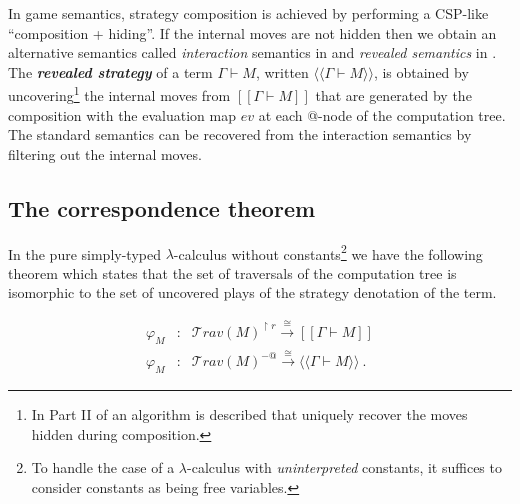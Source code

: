 \documentclass{llncs}
\newcommand\defname[1]{{\bf\em #1}\index{#1}}
\newcommand\travset{\mathcal{T}rav}
\newcommand{\sem}[1]{{[\![ #1 ]\!]}}
\newcommand{\intersem}[1]{{\langle\!\langle #1 \rangle\!\rangle}}
\begin{document}
In game semantics, strategy composition is achieved by performing a
CSP-like ``composition + hiding''. If the internal moves are not hidden
then we obtain an alternative semantics called \emph{interaction}
semantics in \cite{DBLP:conf/sas/DimovskiGL05} and \emph{revealed
semantics} in \cite{willgreenlandthesis}.
The \defname{revealed strategy} of a term $\Gamma \vdash M$, written $\intersem{\Gamma \vdash M}$, is obtained by uncovering\footnote{In Part II of \cite{hylandong_pcf} an algorithm is described that
uniquely recover the moves hidden during composition.} the
internal moves from $\sem{\Gamma \vdash M}$ that are generated by the composition with the evaluation map $ev$ at each @-node of the computation tree.
The standard semantics can be recovered from the interaction semantics by filtering out the internal moves.


\subsection{The correspondence theorem}

In the pure simply-typed $\lambda$-calculus without constants\footnote{To handle the case of a $\lambda$-calculus with \emph{uninterpreted} constants, it suffices to
consider constants as being free variables.} we have the following theorem which 
states that the set of traversals of the computation tree is isomorphic to the set of uncovered plays of the strategy 
denotation of the term.
\begin{theorem}
\label{thm:correspondence}
\begin{eqnarray*}
 \varphi_M  &:& \travset(M)^{\upharpoonright r} \stackrel{\cong}{\longrightarrow} \sem{\Gamma \vdash M} \\
 \varphi_M  &:& \travset(M)^{-@} \stackrel{\cong}{\longrightarrow} \intersem{\Gamma \vdash M} \ .
\end{eqnarray*}
\end{theorem}
\end{document}
